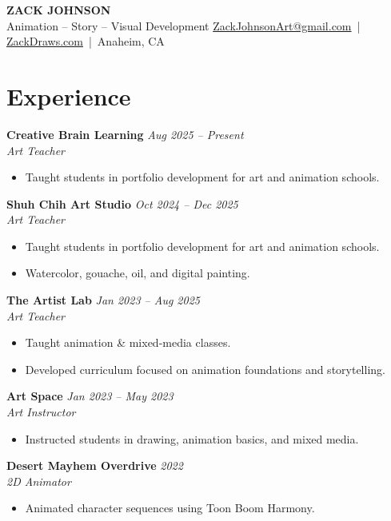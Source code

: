 \documentclass[11pt,letterpaper]{article}
\begin{document}
\raggedright
{\huge \textbf{ZACK JOHNSON}}\\[-2pt]
\large Animation -- Story -- Visual Development
\vspace{1pt}
\small
\href{mailto:ZackJohnsonArt@gmail.com}{ZackJohnsonArt@gmail.com} \,|\, 
\href{https://ZackDraws.com}{ZackDraws.com} \,|\, Anaheim, CA
\normalsize

\section{Experience}
\textbf{Creative Brain Learning} \hfill \textit{Aug 2025 -- Present}\\
\textit{Art Teacher}
\begin{itemize}
    \item Taught students in portfolio development for art and animation schools.
\end{itemize}

\textbf{Shuh Chih Art Studio} \hfill \textit{Oct 2024 -- Dec 2025}\\
\textit{Art Teacher}
\begin{itemize}
    \item Taught students in portfolio development for art and animation schools.
    \item Watercolor, gouache, oil, and digital painting.
\end{itemize}

\textbf{The Artist Lab} \hfill \textit{Jan 2023 -- Aug 2025}\\
\textit{Art Teacher}
\begin{itemize}
    \item Taught animation \& mixed-media classes.
    \item Developed curriculum focused on animation foundations and storytelling.
\end{itemize}

\textbf{Art Space} \hfill \textit{Jan 2023 -- May 2023}\\
\textit{Art Instructor}
\begin{itemize}
    \item Instructed students in drawing, animation basics, and mixed media.
\end{itemize}

\textbf{Desert Mayhem Overdrive} \hfill \textit{2022}\\
\textit{2D Animator}
\begin{itemize}
    \item Animated character sequences using Toon Boom Harmony.
\end{itemize}
\end{document}
